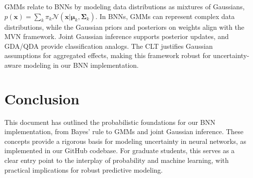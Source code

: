 \documentclass[12pt]{article}
\theoremstyle{plain}
\theoremstyle{definition}
\newcommand{\N}{\mathcal{N}}
\begin{document}
GMMs relate to BNNs by modeling data distributions as mixtures of Gaussians, \( p(\mathbf{x}) = \sum_k \pi_k \N(\mathbf{x} | \boldsymbol{\mu}_k, \boldsymbol{\Sigma}_k) \). In BNNs, GMMs can represent complex data distributions, while the Gaussian priors and posteriors on weights align with the MVN framework. Joint Gaussian inference supports posterior updates, and GDA/QDA provide classification analogs. The CLT justifies Gaussian assumptions for aggregated effects, making this framework robust for uncertainty-aware modeling in our BNN implementation.

\section{Conclusion}
This document has outlined the probabilistic foundations for our BNN implementation, from Bayes' rule to GMMs and joint Gaussian inference. These concepts provide a rigorous basis for modeling uncertainty in neural networks, as implemented in our GitHub codebase. For graduate students, this serves as a clear entry point to the interplay of probability and machine learning, with practical implications for robust predictive modeling.
\end{document}
